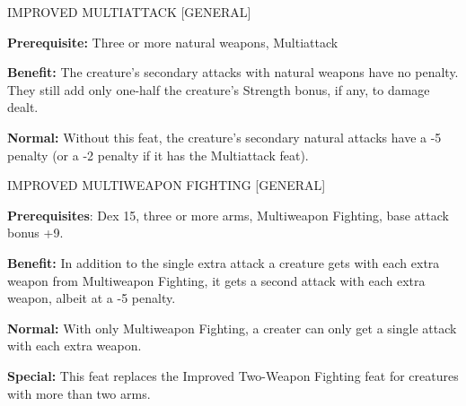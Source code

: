 \documentclass{article}
\begin{document}
\vspace{12pt}
IMPROVED MULTIATTACK [GENERAL]

\textbf{Prerequisite:} Three or more natural weapons, Multiattack

\textbf{Benefit: }The creature's secondary attacks with natural weapons have no 
penalty. They still add only one-half the creature's Strength bonus, if any, to 
damage dealt.

\textbf{Normal:} Without this feat, the creature's secondary natural attacks have 
a -5 penalty (or a -2 penalty if it has the Multiattack feat).

\vspace{12pt}
IMPROVED MULTIWEAPON FIGHTING [GENERAL]

\textbf{Prerequisites}: Dex 15, three or more arms, Multiweapon Fighting, base 
attack bonus +9.

\textbf{Benefit:} In addition to the single extra attack a creature gets with each 
extra weapon from Multiweapon Fighting, it gets a second attack with each extra 
weapon, albeit at a -5 penalty.

\textbf{Normal:} With only Multiweapon Fighting, a creater can only get a single 
attack with each extra weapon. 

\textbf{Special:} This feat replaces the Improved Two-Weapon Fighting feat for 
creatures with more than two arms.

\newpage
\end{document}
